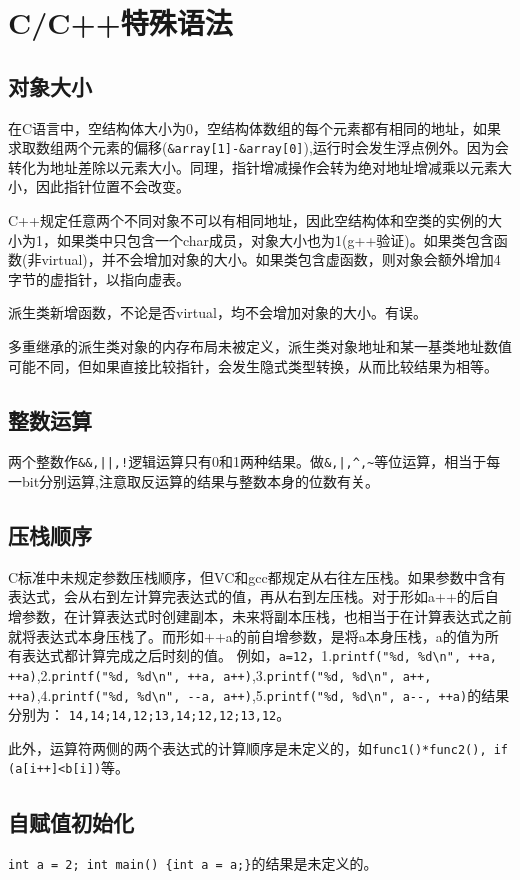 \section{C/C++特殊语法}

\subsection{对象大小}
在C语言中，空结构体大小为0，空结构体数组的每个元素都有相同的地址，如果求取数组两个元素的偏移(\verb|&array[1]-&array[0]|),运行时会发生浮点例外。因为会转化为地址差除以元素大小。同理，指针增减操作会转为绝对地址增减乘以元素大小，因此指针位置不会改变。

C++规定任意两个不同对象不可以有相同地址，因此空结构体和空类的实例的大小为1，如果类中只包含一个char成员，对象大小也为1(g++验证)。如果类包含函数(非virtual)，并不会增加对象的大小。如果类包含虚函数，则对象会额外增加4字节的虚指针，以指向虚表。

派生类新增函数，不论是否virtual，均不会增加对象的大小。\cite{pibible}有误。

多重继承的派生类对象的内存布局未被定义，派生类对象地址和某一基类地址数值可能不同，但如果直接比较指针，会发生隐式类型转换，从而比较结果为相等。

\subsection{整数运算}
两个整数作\verb+&&,||,!+逻辑运算只有0和1两种结果。做\verb+&,|,^,~+等位运算，相当于每一bit分别运算,注意取反运算的结果与整数本身的位数有关。

\subsection{压栈顺序}
C标准中未规定参数压栈顺序，但VC和gcc都规定从右往左压栈。如果参数中含有表达式，会从右到左计算完表达式的值，再从右到左压栈。对于形如a++的后自增参数，在计算表达式时创建副本，未来将副本压栈，也相当于在计算表达式之前就将表达式本身压栈了。而形如++a的前自增参数，是将a本身压栈，a的值为所有表达式都计算完成之后时刻的值。
例如，\verb|a=12|，1.\verb|printf("%d, %d\n", ++a, ++a)|,2.\verb|printf("%d, %d\n", ++a, a++)|,3.\verb|printf("%d, %d\n", a++, ++a)|,4.\verb|printf("%d, %d\n", --a, a++)|,5.\verb|printf("%d, %d\n", a--, ++a)|的结果分别为：
\verb|14,14;14,12;13,14;12,12;13,12|。

此外，运算符两侧的两个表达式的计算顺序是未定义的，如\verb|func1()*func2(), if (a[i++]<b[i])|等。

\subsection{自赋值初始化}
\verb+int a = 2; int main() {int a = a;}+的结果是未定义的。


